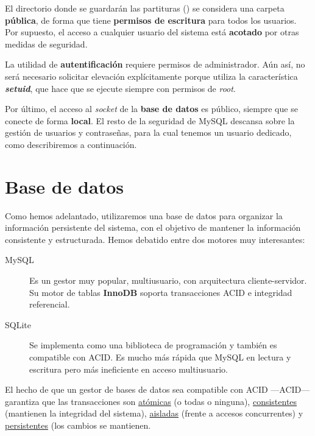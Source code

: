 El directorio donde se guardarán las partituras () se considera una carpeta \textbf{pública}, de forma que tiene \textbf{permisos de escritura} para todos los usuarios. Por supuesto, el acceso a cualquier usuario del sistema está \textbf{acotado} por otras medidas de seguridad.

La utilidad de \textbf{autentificación} requiere permisos de administrador. Aún así, no será necesario solicitar elevación explícitamente porque utiliza la característica \textbf{\textit{setuid}}, que hace que se ejecute siempre con permisos de \textit{root}.

Por último, el acceso al \textit{socket} de la \textbf{base de datos} es público, siempre que se conecte de forma \textbf{local}. El resto de la seguridad de MySQL descansa sobre la gestión de usuarios y contraseñas, para la cual tenemos un usuario dedicado, como describiremos a continuación.

\newpage

\section{Base de datos}

Como hemos adelantado, utilizaremos una base de datos para organizar la información persistente del sistema, con el objetivo de mantener la información consistente y estructurada. Hemos debatido entre dos motores muy interesantes:

\begin{description}
	\item[MySQL] Es un gestor muy popular, multiusuario, con arquitectura cliente-servidor. Su motor de tablas \textbf{InnoDB} soporta transacciones \acrshort{ACID} e integridad referencial. \cite{wiki_innodb}
	
	\item[SQLite] Se implementa como una biblioteca de programación y también es compatible con \acrshort{ACID}. Es mucho más rápida que MySQL en lectura y escritura pero más ineficiente en acceso multiusuario.
\end{description}

El hecho de que un gestor de bases de datos sea compatible con \acrshort{ACID} ---\acrlong{ACID}--- garantiza que las transacciones son \underline{atómicas} (o todas o ninguna), \underline{consistentes} (mantienen la integridad del sistema), \underline{aisladas} (frente a accesos concurrentes) y \underline{persistentes} (los cambios se mantienen. \cite{wiki_acid}

